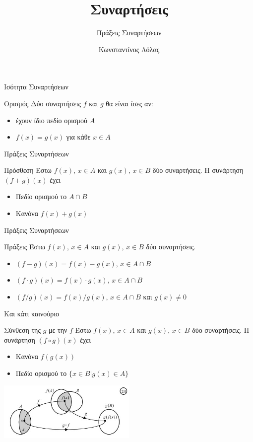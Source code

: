 \documentclass{presentation}
\title{Συναρτήσεις}
\subtitle{Πράξεις Συναρτήσεων}
\author[Λόλας]{Κωνσταντίνος Λόλας }
\institute[$10^ο$ ΓΕΛ]{$10^ο$ ΓΕΛ Θεσσαλονίκης}
\date{}
\begin{document}
\begin{frame}
  \titlepage
\end{frame}
\begin{frame}{Ισότητα Συναρτήσεων}
  \begin{block}{Ορισμός}
    Δύο συναρτήσεις $f$ και $g$ θα είναι ίσες αν:
    \begin{itemize}
      \item έχουν ίδιο πεδίο ορισμού $Α$
      \item $f(x)=g(x)$ για κάθε $x\in Α$
    \end{itemize}
  \end{block}
\end{frame}

\begin{frame}{Πράξεις Συναρτήσεων}
  \begin{block}{Πρόσθεση}
    Έστω $f(x)$, $x\in Α$ και $g(x)$, $x\in Β$ δύο συναρτήσεις. Η συνάρτηση $(f+g)(x)$ έχει
    \begin{itemize}
      \item Πεδίο ορισμού το $A\cap Β$
      \item Κανόνα $f(x)+g(x)$
    \end{itemize}
  \end{block}
\end{frame}

\begin{frame}{Πράξεις Συναρτήσεων}
  \begin{block}{Πράξεις}
    Έστω $f(x)$, $x\in Α$ και $g(x)$, $x\in Β$ δύο συναρτήσεις.
    \begin{itemize}
      \item $(f-g)(x)=f(x)-g(x)$, $x\in A\cap Β$
      \item $(f\cdot g)(x)=f(x)\cdot g(x)$, $x\in A\cap Β$
      \item $(f/g)(x)=f(x)/g(x)$, $x\in A\cap Β$ και $g(x)\ne 0$
    \end{itemize}
  \end{block}
\end{frame}

\begin{frame}{Και κάτι καινούριο}
  \begin{block}{Σύνθεση της $g$ με την $f$}
    Έστω $f(x)$, $x\in Α$ και $g(x)$, $x\in Β$ δύο συναρτήσεις. Η συνάρτηση $(f\circ g)(x)$ έχει
    \begin{itemize}
      \item Κανόνα $f(g(x))$
      \item Πεδίο ορισμού το $\{x\in Β | g(x)\in Α \}$
    \end{itemize}
  \end{block}
  \centering
  \includegraphics[width=0.5\textwidth]{"images/1.2 Σύνθεση.png"}
\end{frame}
\end{document}
